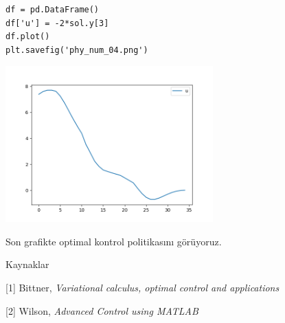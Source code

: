 \documentclass[12pt,fleqn]{article}\usepackage{../../common}
\begin{document}
\begin{verbatim}
df = pd.DataFrame()
df['u'] = -2*sol.y[3]
df.plot()
plt.savefig('phy_num_04.png')
\end{verbatim}

\includegraphics[height=6cm]{phy_num_04.png}

Son grafikte optimal kontrol politikasını görüyoruz. 

Kaynaklar

[1] Bittner, {\em Variational calculus, optimal control and applications}

[2] Wilson, {\em Advanced Control using MATLAB}
\end{document}
